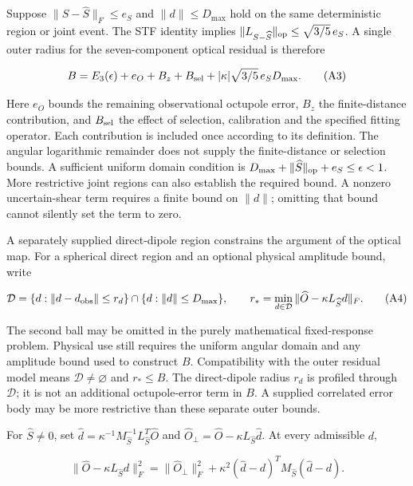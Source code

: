 Suppose \(\|S-\widehat S\|_F\leq e_S\) and \(\|d\|\leq D_{\max}\) hold
on the same deterministic region or joint event. The STF identity
implies \(\|L_{S-\widehat S}\|_{\rm op}\leq\sqrt{3/5}\,e_S\). A single
outer radius for the seven-component optical residual is therefore

\begin{equation}
B=E_3(\epsilon)+e_O+B_z+B_{\rm sel}
       +|\kappa|\sqrt{3/5}\,e_SD_{\max}.\tag{A3}
\end{equation}

Here \(e_O\) bounds the remaining observational octupole error, \(B_z\)
the finite-distance contribution, and \(B_{\rm sel}\) the effect of
selection, calibration and the specified fitting operator. Each
contribution is included once according to its definition. The angular
logarithmic remainder does not supply the finite-distance or selection
bounds. A sufficient uniform domain condition is
\(D_{\max}+\|\widehat S\|_{\rm op}+e_S\leq\epsilon<1\). More restrictive
joint regions can also establish the required bound. A nonzero
uncertain-shear term requires a finite bound on \(\|d\|\); omitting that
bound cannot silently set the term to zero.

A separately supplied direct-dipole region constrains the argument of
the optical map. For a spherical direct region and an optional physical
amplitude bound, write

\begin{equation}
\mathcal D=\{d:\|d-d_{\rm obs}\|\leq r_d\}
             \cap\{d:\|d\|\leq D_{\max}\},\qquad
 r_*=\min_{d\in\mathcal D}\|\widehat O-\kappa L_{\widehat S}d\|_F.\tag{A4}
\end{equation}

The second ball may be omitted in the purely mathematical fixed-response
problem. Physical use still requires the uniform angular domain and any
amplitude bound used to construct \(B\). Compatibility with the outer
residual model means \(\mathcal D\ne\varnothing\) and \(r_*\leq B\). The
direct-dipole radius \(r_d\) is profiled through \(\mathcal D\); it is
not an additional octupole-error term in \(B\). A supplied correlated
error body may be more restrictive than these separate outer bounds.

For \(\widehat S\ne0\), set
\(\widehat d=\kappa^{-1}M_{\widehat S}^{-1}L_{\widehat S}^T\widehat O\)
and \(\widehat O_\perp=\widehat O-\kappa L_{\widehat S}\widehat d\). At
every admissible \(d\),

\begin{equation}
\|\widehat O-\kappa L_{\widehat S}d\|_F^2
 =\|\widehat O_\perp\|_F^2
 +\kappa^2(\widehat d-d)^TM_{\widehat S}(\widehat d-d).\tag{A5}
\end{equation}

